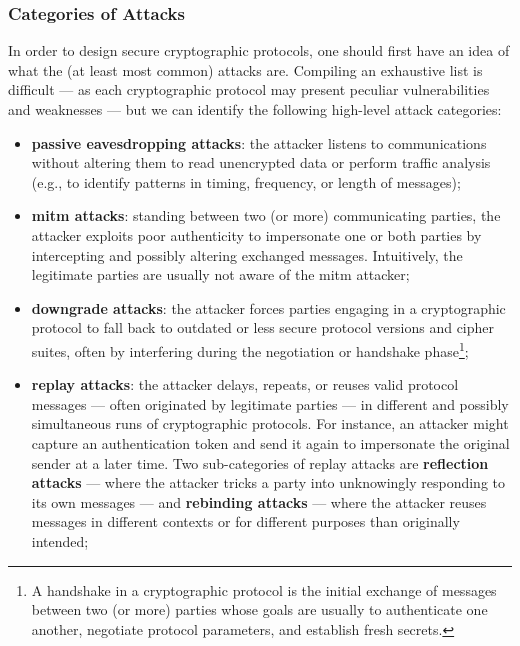 \subsubsection{Categories of Attacks}\label{sec:security_of_cryptographic_protocols:design:attacks}

In order to design secure cryptographic protocols, one should first have an idea of what the (at least most common) attacks are. Compiling an exhaustive list is difficult --- as each cryptographic protocol may present peculiar vulnerabilities and weaknesses --- but we can identify the following high-level attack categories:

\begin{itemize}
	
	\item \textbf{passive eavesdropping attacks}: the attacker listens to communications without altering them to read unencrypted data or perform traffic analysis (e.g., to identify patterns in timing, frequency, or length of messages);
	
	\item \textbf{\gls{mitm} attacks}: standing between two (or more) communicating parties, the attacker exploits poor authenticity to impersonate one or both parties by intercepting and possibly altering exchanged messages. Intuitively, the legitimate parties are usually not aware of the \gls{mitm} attacker;
	
	\item \textbf{downgrade attacks}: the attacker forces parties engaging in a cryptographic protocol to fall back to outdated or less secure protocol versions and cipher suites, often by interfering during the negotiation or handshake phase\footnote{A handshake in a cryptographic protocol is the initial exchange of messages between two (or more) parties whose goals are usually to authenticate one another, negotiate protocol parameters, and establish fresh secrets.};
	
	
	\item \textbf{replay attacks}: the attacker delays, repeats, or reuses valid protocol messages --- often originated by legitimate parties --- in different and possibly simultaneous runs of cryptographic protocols. For instance, an attacker might capture an authentication token and send it again to impersonate the original sender at a later time. Two sub-categories of replay attacks are \textbf{reflection attacks} --- where the attacker tricks a party into unknowingly responding to its own messages --- and \textbf{rebinding attacks} --- where the attacker reuses messages in different contexts or for different purposes than originally intended;
	

\end{itemize}
